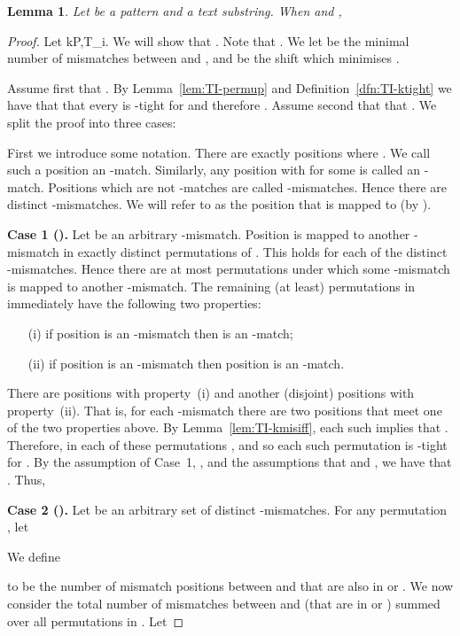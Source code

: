 \documentclass[11pt]{article}
\theoremstyle{plain}
\newtheorem{lemma}[theorem]{Lemma}
\theoremstyle{definition}
\begin{document}
\begin{lemma}
    \label{lem:k-tight}
    Let  be a pattern and  a text substring. When  and ,

\end{lemma}
\begin{proof}
    Let kP,T_i. We will show that . Note that . We let  be the minimal number of mismatches between  and , and  be the shift which minimises .

    Assume first that . By Lemma~\ref{lem:TI-permup} and Definition~\ref{dfn:TI-ktight} we have that that every  is -tight for  and therefore . Assume second that that .  We split the proof into three cases:


    First we introduce some notation. There are exactly  positions  where . We call such a position an -match. Similarly, any position with  for some  is called an -match. Positions which are not -matches are called -mismatches. Hence there are  distinct -mismatches. We will refer to  as the position that  is mapped to (by ).
    \medskip

    \noindent
    \textbf{Case 1 ().}
    Let  be an arbitrary -mismatch. Position  is mapped to another  -mismatch in exactly  distinct permutations of . This holds for each of the  distinct -mismatches. Hence there are at most  permutations under which some -mismatch is mapped to another -mismatch. The remaining (at least)  permutations  in  immediately have the following two properties:
\begin{enumerate}
        \setlength{\itemsep}{0pt}
        \item[(i)] if position  is an -mismatch then  is an -match;
        \item[(ii)] if position  is an -mismatch then position  is an -match.
    \end{enumerate}
There are  positions  with property~(i) and another (disjoint)  positions  with property~(ii). That is, for each -mismatch there are two positions  that meet one of the two properties above. By Lemma~\ref{lem:TI-kmisiff}, each such  implies that . Therefore, in each of these  permutations ,  and so each such permutation is -tight for . By the assumption of Case~1, , and the assumptions that  and , we have that . Thus, 
    \medskip

    \noindent
    \textbf{Case 2 ().}
    Let  be an arbitrary set of  distinct -mismatches. For any permutation , let

We define

to be the number of mismatch positions between  and  that are also in  or . We now consider the total number of mismatches between  and  (that are in  or ) summed over all permutations in . Let



\end{proof}
\end{document}
